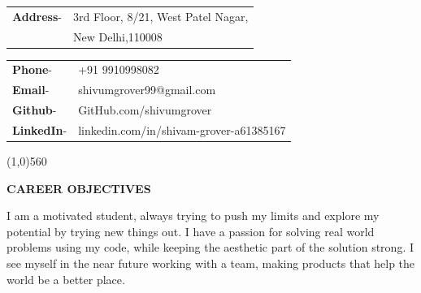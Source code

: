 \documentclass[10pt]{article}
\begin{document}
\begin{minipage}{0.5\textwidth}

\vspace{5mm}
\hspace{3mm}
\begin{tabular}{l l}\raggedleft
\color{black!70}\textbf{Address}-& \color{black!70}3rd Floor, 8/21, West Patel Nagar, \\  
    
    & \color{black!70}New Delhi,110008\\

\end{tabular}
\end{minipage}
\begin{minipage}{0.4\textwidth}

\vspace{5mm}
\begin{flushright}
\begin{tabular}{l l}\raggedleft

\color{black!70}\textbf{Phone}-& \color{black!70}+91 9910998082\\ 
\color{black!70}\textbf{Email}-& \color{black!70}shivumgrover99@gmail.com\\
\color{black!70}\textbf{Github}-& \color{black!70}GitHub.com/shivumgrover\\
\color{black!70}\textbf{LinkedIn}-& \color{black!70}linkedin.com/in/shivam-grover-a61385167\\
\end{tabular}
\end{flushright}
\end{minipage}



\begin{center}
\line(1,0){560}
\end{center}

\begin{minipage}{0.95\textwidth}
\vspace{5mm}
\begin{huge}
\textbf{\color{theme}CAREER OBJECTIVES}
\end{huge}
\begin{mdframed}[backgroundcolor=theme]
\end{mdframed}

\vspace{1mm}

\color{black}\normalsize{{I am a motivated student, always trying to push my limits and explore my potential by trying new things out. I have a passion for solving real world problems using my code, while keeping the aesthetic part of the solution strong. I see myself in the near future working with a team, making products that help the world be a better place.
}}
\vspace{5mm}
\end{minipage}
\end{document}
